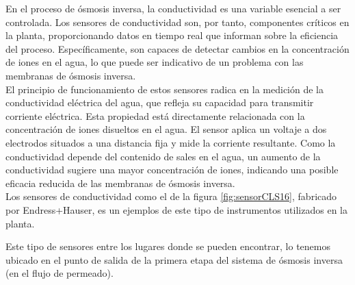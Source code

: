 En el proceso de ósmosis inversa, la conductividad es una variable esencial a ser controlada. Los sensores de
conductividad son, por tanto, componentes críticos en la planta, proporcionando datos en tiempo real que informan
sobre la eficiencia del proceso. Específicamente, son capaces de detectar cambios en la concentración de iones
en el agua, lo que puede ser indicativo de un problema con las membranas de ósmosis inversa.\\

El principio de funcionamiento de estos sensores radica en la medición de la conductividad eléctrica del agua,
que refleja su capacidad para transmitir corriente eléctrica. Esta propiedad está directamente relacionada
con la concentración de iones disueltos en el agua. El sensor aplica un voltaje a dos electrodos situados a una
distancia fija y mide la corriente resultante. Como la conductividad depende del contenido de sales en el agua,
un aumento de la conductividad sugiere una mayor concentración de iones, indicando una posible eficacia reducida
de las membranas de ósmosis inversa.\\

Los sensores de conductividad como el de la figura \ref{fig:sensorCLS16}, fabricado por Endress+Hauser, es un  ejemplos de este tipo de
instrumentos utilizados en la planta.\\


Este tipo de sensores entre los lugares donde se pueden encontrar, lo tenemos ubicado en el punto de salida de la primera
etapa del sistema de ósmosis inversa (en el flujo de permeado).\\


